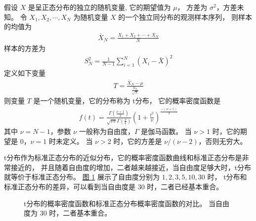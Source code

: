 \documentclass[letterpaper,10pt,english]{sphinxmanual}
\begin{document}
假设 \(X\) 是呈正态分布的独立的随机变量,
它的期望值为 \(\mu\)，
方差为 \(\sigma^2\)，方差未知。
令 \(X_1,X_2,\cdots,X_N\)
为随机变量 \(X\) 的一个独立同分布的观测样本序列，
则样本的均值为
\begin{equation}\label{equation:概率基础/content:概率基础/content:82}
\begin{split}\bar{X}_N = \frac{X_1+X_2+\cdots+X_N}{N}\end{split}
\end{equation}
样本的方差为
\begin{equation}\label{equation:概率基础/content:概率基础/content:83}
\begin{split}S_N^2 = \frac{1}{N-1} \sum_{i=1}^N(X_i - \bar{X})^2\end{split}
\end{equation}
定义如下变量
\begin{equation}\label{equation:概率基础/content:概率基础/content:84}
\begin{split}T= \frac{\bar{X}_N - \mu}{\frac{S_N}{\sqrt{N}}}\end{split}
\end{equation}
则变量 \(T\) 是一个随机变量，它的分布称为 t\sphinxhyphen{}分布，
它的概率密度函数是
\begin{equation}\label{equation:概率基础/content:概率基础/content:85}
\begin{split}f(t) = \frac{\Gamma(\frac{\nu+1}{2})}{\sqrt{\nu\pi}\Gamma(\frac{\nu}{2})}(1+\frac{t^2}{\nu})^{\frac{-(\nu+1)}{2}}\end{split}
\end{equation}
其中 \(\nu=N-1\)，参数 \(\nu\) 一般称为自由度，\(\Gamma\) 是伽马函数。
当 \(\nu>1\) 时，它的期望是 \(0\)，\(\nu=1\) 时未定义。
当 \(\nu>2\) 时，它的方差是 \(\nu/(\nu-2)\)，否则无穷大。

t分布作为标准正态分布的近似分布，它的概率密度函数曲线和标准正态分布是非常接近的，
并且随着自由度的增加，二者越来越接近，当自由度足够大时，t分布就等价于标准正态分布。
\hyperref[\detokenize{_u6982_u7387_u57fa_u7840/content:fg-probability-015}]{图 \ref{\detokenize{_u6982_u7387_u57fa_u7840/content:fg-probability-015}}} 展示了自由度分别为 \(1, 2, 3, 5, 10, 30\) 时，
t分布和标准正态分布的差异，可以看到当自由度是 \(30\) 时，二者已经基本重合。

\begin{figure}[htbp]
\centering
\capstart

\noindent{}
\caption{t分布的概率密度函数和标准正态分布概率密度函数的对比。
当自由度为 \(30\) 时，二者基本重合。}\label{\detokenize{_u6982_u7387_u57fa_u7840/content:id33}}\label{\detokenize{_u6982_u7387_u57fa_u7840/content:fg-probability-015}}\end{figure}
\end{document}

